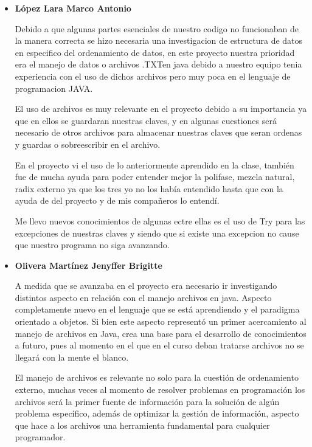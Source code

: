 \documentclass[letterpaper,12pt]{extarticle}
\begin{document}
\begin{itemize}
    \item \textbf{López Lara Marco Antonio}
    
    Debido a que algunas partes esenciales de nuestro codigo no funcionaban de la manera correcta se hizo necesaria una investigacion de estructura de datos en especifico del ordenamiento de datos, en este proyecto nuestra prioridad era el manejo de datos o archivos .TXTen java debido a nuestro equipo tenia experiencia con el uso de dichos archivos pero muy poca en el lenguaje de programacion JAVA.
    
    El uso de archivos es muy relevante en el proyecto debido a su importancia ya que en ellos se guardaran nuestras claves, y en algunas cuestiones será necesario de otros archivos para almacenar nuestras claves que seran ordenas y guardas o sobreescribir en el archivo.
    
    En el proyecto vi el uso de lo anteriormente aprendido en la clase, también fue de mucha ayuda para poder entender mejor la polifase, mezcla natural, radix externo ya que los tres yo no los había entendido hasta que con la ayuda de del proyecto y de mis compañeros lo entendí.
    
    Me llevo nuevos conocimientos de algunas ectre ellas es el uso de Try para las excepciones de nuestras claves y siendo que si existe una excepcion no cause que nuestro programa no siga avanzando.
    
    
    \item \textbf{Olivera Martínez Jenyffer Brigitte}
    
    A medida que se avanzaba en el proyecto era necesario ir investigando distintos aspecto en relación con el manejo archivos en java. Aspecto completamente nuevo en el lenguaje que se está aprendiendo y el paradigma orientado a objetos. Si bien este aspecto representó un primer acercamiento al manejo de archivos en Java, crea una base para el desarrollo de conocimientos a futuro, pues al momento  en el que en el curso deban tratarse archivos no se llegará con la mente el blanco.

    El manejo de archivos es relevante no solo para la cuestión de ordenamiento externo, muchas veces al momento de resolver problemas en programación los archivos será la primer fuente de información para la solución de algún problema  específico, además de optimizar la gestión de información, aspecto que hace a los archivos una herramienta fundamental para cualquier programador.
    

\end{itemize}
\end{document}
